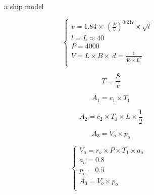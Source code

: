 \documentclass{mcmthesis}
\begin{document}
\begin{figure}[tbp]
  \caption{a ship model}\label{figure1}
\end{figure}

\begin{equation}
\left\{
\begin{array}{lr}
v=1.84\times \ (\frac{P}{V}) ^{0.237} \times \sqrt{l} &\\
l=L\approx 40 &\\
P=4000&\\
V=L\times B\times\ d =\frac{1}{48\times L^3}\\
\end{array}
\right.
\end{equation}

\begin{equation}\label{5}
T=\frac{S}{v}
\end{equation}


\begin{equation}\label{5}
A_1=c_1 \times T_1
\end{equation}

\begin{equation}\label{6}
A_2=c_2  \times T_1 \times L \times  \frac{1}{2}
\end{equation}

\begin{equation}\label{7}
A_3=V_o  \times p_o
\end{equation}

\begin{equation}
\left\{
\begin{array}{lr}
V_o=r_o \times P \times T_1 \times a_o &\\
a_o=0.8&\\
p_o=0.5&\\
A_3=V_o  \times p_o\\
\end{array}
\right.
\end{equation}
\end{document}
